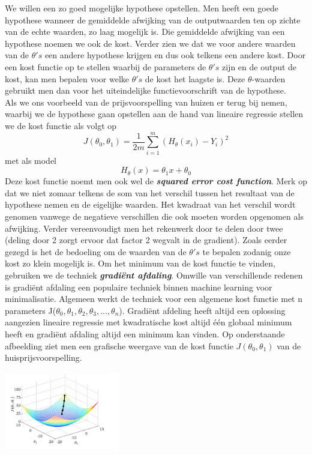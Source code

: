 We willen een zo goed mogelijke hypothese opstellen. Men heeft een goede hypothese wanneer de gemiddelde afwijking van de outputwaarden ten op zichte van de echte waarden, zo laag mogelijk is. Die gemiddelde afwijking van een hypothese noemen we ook de kost. Verder zien we dat we voor andere waarden van de $\theta's$ een andere hypothese krijgen en dus ook telkens een andere kost. Door een kost functie op te stellen waarbij de parameters de $\theta's$ zijn en de output de kost, kan men bepalen voor welke $\theta's$ de kost het laagste is. Deze $\theta$-waarden gebruikt men dan voor het uiteindelijke functievoorschrift van de hypothese. \\
Als we ons voorbeeld van de prijsvoorspelling van huizen er terug bij nemen, waarbij we de hypothese gaan opstellen aan de hand van lineaire regressie stellen we de kost functie als volgt op\\
\[J(\theta_{0},\theta_{1}) = \frac{1}{2m}\sum_{i=1}^{m} (H_{\theta}(x_i) - Y_i )^2\]
met als model 
\[H_{\theta}(x) = \theta_{1}x + \theta_{0}\]
%
Deze kost functie noemt men ook wel de \textbf{\textit{squared error cost function}}. Merk op dat we niet zomaar telkens de som van het verschil tussen het resultaat van de hypothese nemen en de eigelijke waarden. Het kwadraat van het verschil wordt genomen vanwege de negatieve verschillen die ook moeten worden opgenomen als afwijking. Verder vereenvoudigt men het rekenwerk door te delen door twee (deling door 2 zorgt ervoor dat factor 2 wegvalt in de gradient). 
\newline
Zoals eerder gezegd is het de bedoeling om de waarden van de $\theta's$ te bepalen zodanig onze kost zo klein mogelijk is. Om het minimum van de kost functie te vinden, gebruiken we de techniek \textbf{\textit{gradi\"ent afdaling}}. Omwille van verschillende redenen is gradi\"ent afdaling een populaire techniek binnen machine learning voor minimalisatie. Algemeen werkt de techniek voor een algemene kost functie met n parameters J($\theta_{0},\theta_{1},\theta_{2},\theta_{3}, ... ,\theta_{n}$). Gradi\"ent afdeling heeft altijd een oplossing aangezien lineaire regressie met kwadratische kost altijd \'e\'en globaal minimum heeft en gradi\"ent afdaling altijd een minimum kan vinden.
Op onderstaande afbeelding ziet men een grafische weergave van de kost functie $J(\theta_{0},\theta_{1})$ van de huisprijsvoorspelling.
\newline
\begin{center}
  \includegraphics[width=5cm]{3d_plot_1}
\end{center}
